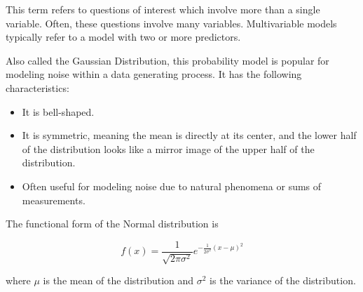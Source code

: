 \documentclass[
  letterpaper,
  DIV=11,
  numbers=noendperiod]{scrreprt}
\providecommand{\tightlist}{%
  \setlength{\itemsep}{0pt}\setlength{\parskip}{0pt}}\usepackage{longtable,booktabs,array}
\theoremstyle{definition}
\theoremstyle{definition}
\theoremstyle{plain}
\theoremstyle{remark}
\begin{document}
\begin{description}
\tightlist
\item[Multivariable (Definition~\ref{def-multivariable})]
This term refers to questions of interest which involve more than a
single variable. Often, these questions involve many variables.
Multivariable models typically refer to a model with two or more
predictors.
\item[Normal Distribution (Definition~\ref{def-normal-distribution})]
Also called the Gaussian Distribution, this probability model is popular
for modeling noise within a data generating process. It has the
following characteristics:
\end{description}

\begin{itemize}
\tightlist
\item
  It is bell-shaped.
\item
  It is symmetric, meaning the mean is directly at its center, and the
  lower half of the distribution looks like a mirror image of the upper
  half of the distribution.
\item
  Often useful for modeling noise due to natural phenomena or sums of
  measurements.
\end{itemize}

The functional form of the Normal distribution is

\[f(x) = \frac{1}{\sqrt{2\pi\sigma^2}} e^{-\frac{1}{2\sigma^2}(x - \mu)^2}\]

where \(\mu\) is the mean of the distribution and \(\sigma^2\) is the
variance of the distribution.
\end{document}
